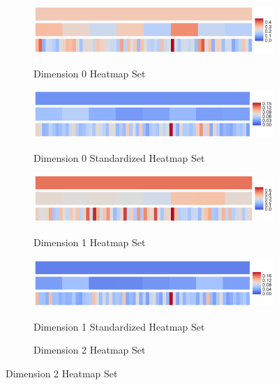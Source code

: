 \documentclass[12pt]{article}
\begin{document}
\begin{figure}[htp!]
  \centering
  \begin{subfigure}{.45\textwidth}
    \centering
    \caption{Dimension 0 Heatmap Set}
    \includegraphics[width=\linewidth]{fig_12_hmap_dim0_nonorm.pdf}
    \label{fig:cubeHeatmap0}
  \end{subfigure}
  \begin{subfigure}{.45\textwidth}
    \centering
    \caption{Dimension 0 Standardized Heatmap Set}
    \includegraphics[width=\linewidth]{fig_12_hmap_dim0_yesnorm.pdf}
    \label{fig:cubeHeatmapStand0}
  \end{subfigure}
  \begin{subfigure}{.45\textwidth}
    \centering
    \caption{Dimension 1 Heatmap Set}
    \includegraphics[width=\linewidth]{fig_12_hmap_dim1_nonorm.pdf}
    \label{fig:cubeHeatmap1}
  \end{subfigure}
  \begin{subfigure}{.45\textwidth}
    \centering
    \caption{Dimension 1 Standardized Heatmap Set}
    \includegraphics[width=\linewidth]{fig_12_hmap_dim1_yesnorm.pdf}
    \label{fig:cubeHeatmapStand1}
  \end{subfigure}
  \begin{subfigure}{.45\textwidth}
    \centering
    \caption{Dimension 2 Heatmap Set}

\end{subfigure}
\end{figure}
\end{document}
